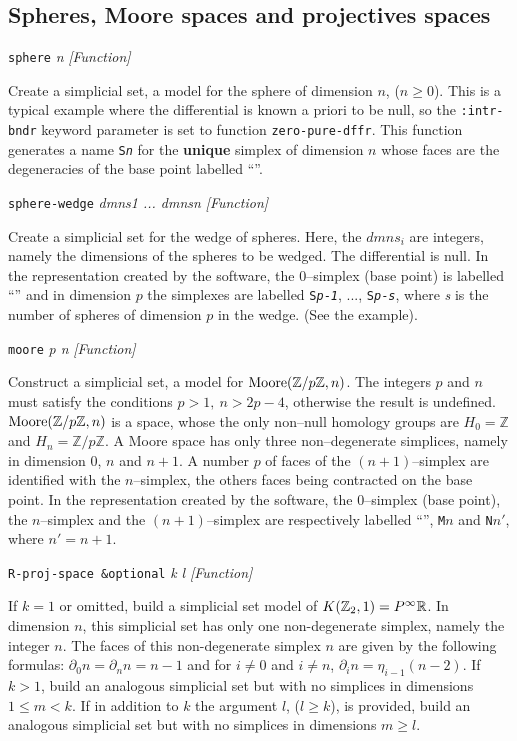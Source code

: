 \subsection {Spheres, Moore spaces and projectives spaces}
{\parindent=0mm
{\leftskip=5mm
{\tt sphere} {\em n} \hfill {\em [Function]} \par}
{\leftskip=15mm
Create a simplicial set, a model  for the sphere of dimension $n$, ($n \geq 0$).
This is a typical example where the differential is known a priori to be null, so the {\tt :intr-bndr}
keyword parameter is set to function {\tt zero-pure-dffr}.
This function generates a name {\tt S{\em n}} for the {\bf unique} simplex of dimension $n$
whose faces are the degeneracies of the base point labelled ``{\tt *}''.  \par}
{\leftskip=5mm
{\tt sphere-wedge} {\em dmns1 ... dmnsn} \hfill {\em [Function]} \par}
{\leftskip=15mm
Create a simplicial set for the wedge of spheres. Here, the $dmns_i$ are integers,
namely the dimensions of the spheres to be wedged. The differential is null.
In the  representation created by the software, the $0$--simplex (base point) is labelled
``{\tt *}'' and in dimension $p$ the simplexes are labelled {\tt S{\em p}-{\em 1}}, ...,
{\tt S{\em p}-{\em s}},  where
{\em s} is the number of spheres of dimension $p$ in the wedge. (See the example). \par}
{\leftskip=5mm
{\tt moore} {\em  p n} \hfill {\em [Function]}\par}
{\leftskip=15mm
Construct a simplicial set, a model for  ${\rm Moore}(\mathbb{Z}/{p\mathbb{Z}},n)$.
The integers $p$ and $n$ must satisfy  the conditions $p>1,\ n> 2p-4$, otherwise
the result is undefined.
${\rm Moore}(\mathbb{Z}/{p\mathbb{Z}},n)$ is a space, whose the only non--null homology groups are $H_0=\mathbb{Z}$
and $H_n=\mathbb{Z}/{p\mathbb{Z}}$. A Moore space has only three non--degenerate simplices, namely in dimension
$0$, $n$ and $n+1$. A number $p$ of faces of the  $(n+1)$--simplex are identified with the $n$--simplex,
the others faces being contracted on the base point.
In the  representation created by the software, the $0$--simplex (base point),
the $n$--simplex and the $(n+1)$--simplex are respectively labelled
``{\tt *}'', {\tt M{$n$}} and {\tt N{$n'$}}, where $n'=n+1$. \par}
{\leftskip=5mm
{\tt R-proj-space \&optional} {\em k l} \hfill {\em [Function]} \par}
{\leftskip=15mm
If $k=1$ or omitted, build a simplicial set model of $K(\mathbb{Z}_2,1)= P^\infty {{\mathbb{R}}}$.
In dimension $n$, this simplicial set has only one non-degenerate simplex, namely the integer $n$.
The faces of this non-degenerate simplex $n$ are given by the following formulas:
$\partial_0 n = \partial_n n = n-1$ and for $i \not= 0$ and $i \not=n$,  $\partial_i n= \eta_{i-1} (n-2)$.
If $k >1$, build an
analogous simplicial set but with no simplices in dimensions $1 \leq m < k$. If in addition to $k$
the argument $l$, ($l \geq k$), is provided, build
an analogous simplicial set but with no simplices in dimensions $m \geq l$. \par
}

}
